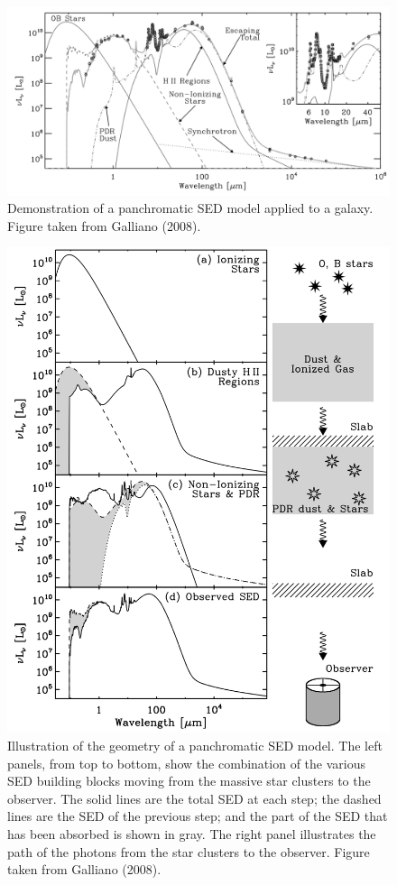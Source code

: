 \documentclass[a4paper,10pt]{article}
\begin{document}
\begin{figure}[h]
    \centering
    \includegraphics[width=14cm]{figures/GalaxySED_appmodel.png}
    \caption{\footnotesize{Demonstration of a panchromatic SED model applied to a galaxy. Figure taken from Galliano (2008).}}
    \label{fig:galaxySEDappmodel}
\end{figure}

\begin{figure}[t!]
    \centering
    \includegraphics[width=14cm]{figures/GalaxySED_geometry.png}
    \caption{\footnotesize{Illustration of the geometry of a panchromatic SED model. The left panels, from top to bottom, show the combination of the various SED building blocks moving from the massive star clusters to the observer. The solid lines are the total SED at each step; the dashed lines are the SED of the previous step; and the part of the SED that has been absorbed is shown in gray. The right panel illustrates the path of the photons from the star clusters to the observer. Figure taken from Galliano (2008).}}
    \label{fig:galaxySEDgeometry}
\end{figure}
\end{document}
